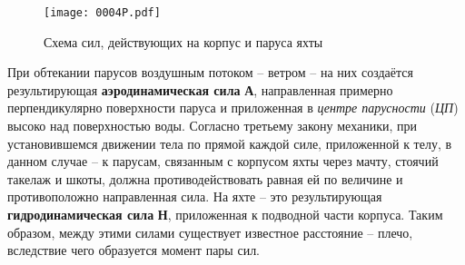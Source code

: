 \begin{figure}[!htb]
  \centering
  \texttt{[image: 0004P.pdf]}
  \caption{Схема сил, действующих на корпус и паруса яхты}
  \label{fig:4}
\end{figure}

При обтекании парусов воздушным потоком \--- ветром \--- на них
создаётся результирующая \textbf{аэродинамическая
  сила} \textbf{А}, направленная примерно
перпендикулярно поверхности паруса и приложенная в \textit{центре парусности}
(\textit{ЦП}) высоко над поверхностью
воды. Согласно третьему закону механики, при установившемся движении
тела по прямой каждой силе, приложенной к телу, в данном случае \--- к
парусам, связанным с корпусом яхты через мачту, стоячий такелаж и
шкоты, должна противодействовать равная ей по величине и
противоположно направленная сила. На яхте \--- это результирующая
\textbf{гидродинамическая сила}
\textbf{Н}, приложенная к подводной части корпуса. Таким образом,
между этими силами существует известное расстояние \--- плечо,
вследствие чего образуется момент пары сил.


